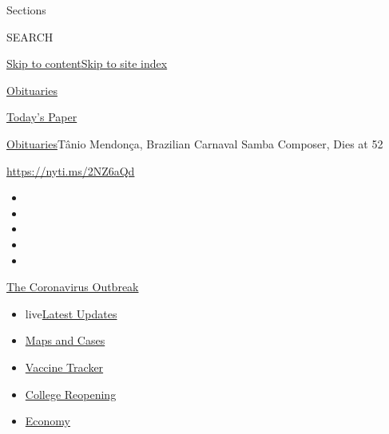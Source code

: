 Sections

SEARCH

\protect\hyperlink{site-content}{Skip to
content}\protect\hyperlink{site-index}{Skip to site index}

\href{https://www.nytimes.com/section/obituaries}{Obituaries}

\href{https://myaccount.nytimes.com/auth/login?response_type=cookie\&client_id=vi}{}

\href{https://www.nytimes.com/section/todayspaper}{Today's Paper}

\href{/section/obituaries}{Obituaries}\textbar{}Tânio Mendonça,
Brazilian Carnaval Samba Composer, Dies at 52

\url{https://nyti.ms/2NZ6aQd}

\begin{itemize}
\item
\item
\item
\item
\item
\end{itemize}

\href{https://www.nytimes.com/news-event/coronavirus?action=click\&pgtype=Article\&state=default\&region=TOP_BANNER\&context=storylines_menu}{The
Coronavirus Outbreak}

\begin{itemize}
\tightlist
\item
  live\href{https://www.nytimes.com/2020/08/03/world/coronavirus-covid-19.html?action=click\&pgtype=Article\&state=default\&region=TOP_BANNER\&context=storylines_menu}{Latest
  Updates}
\item
  \href{https://www.nytimes.com/interactive/2020/us/coronavirus-us-cases.html?action=click\&pgtype=Article\&state=default\&region=TOP_BANNER\&context=storylines_menu}{Maps
  and Cases}
\item
  \href{https://www.nytimes.com/interactive/2020/science/coronavirus-vaccine-tracker.html?action=click\&pgtype=Article\&state=default\&region=TOP_BANNER\&context=storylines_menu}{Vaccine
  Tracker}
\item
  \href{https://www.nytimes.com/2020/08/02/us/covid-college-reopening.html?action=click\&pgtype=Article\&state=default\&region=TOP_BANNER\&context=storylines_menu}{College
  Reopening}
\item
  \href{https://www.nytimes.com/live/2020/08/03/business/stock-market-today-coronavirus?action=click\&pgtype=Article\&state=default\&region=TOP_BANNER\&context=storylines_menu}{Economy}
\end{itemize}

